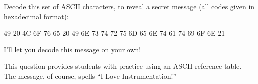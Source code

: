 

Decode this set of ASCII characters, to reveal a secret message (all codes given in hexadecimal format):

\vskip 10pt

\hskip 30pt 49 20 4C 6F 76 65 20 49 6E 73 74 72 75 6D 65 6E 74 61 74 69 6F 6E 21 

\vskip 10pt







I'll let you decode this message on your own!







This question provides students with practice using an ASCII reference table.  The message, of course, spells ``I Love Instrumentation!''




